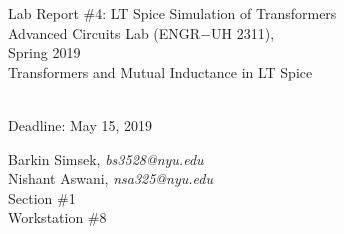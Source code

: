 \documentclass[journal]{IEEEtran}
\begin{document}
\begin{titlepage}
    {\centering
        \vspace*{20em}
        {
        \huge 
        \begin{spacing}{1.5}
            Lab Report \#4: LT Spice Simulation of Transformers
            \\
            Advanced Circuits Lab (ENGR$-$UH 2311),\\
            Spring 2019
            \bigskip
            \Large
            \\
            Transformers and Mutual Inductance in LT Spice
  
            \\
            \bigskip
            Deadline: May 15, 2019 
        \end{spacing}

        }
        
    }
    \vfill
    
    {
    \large
    
    \begin{spacing}{1.5}
    \noindent Barkin Simsek, {\it {bs3528@nyu.edu}} 
    \\
    Nishant Aswani, {\it {nsa325@nyu.edu}}
    \\
    Section \#1%
    \\
    Workstation \#8%
    \end{spacing}
    }


\end{titlepage}
{}
\setcounter{page}{1}




%
{}


\begin{abstract}
In this lab, the purpose was to use the LTSpice software to build and simulate transformers while declaring the mutual inductance between the transformer coils. The voltage and current magnitudes & phase angles were determined by using LTSpice software. The average power dissipated in the load resistor or the second winding was also measured. Measured values were recorded in tables.

\end{abstract}
\end{document}
